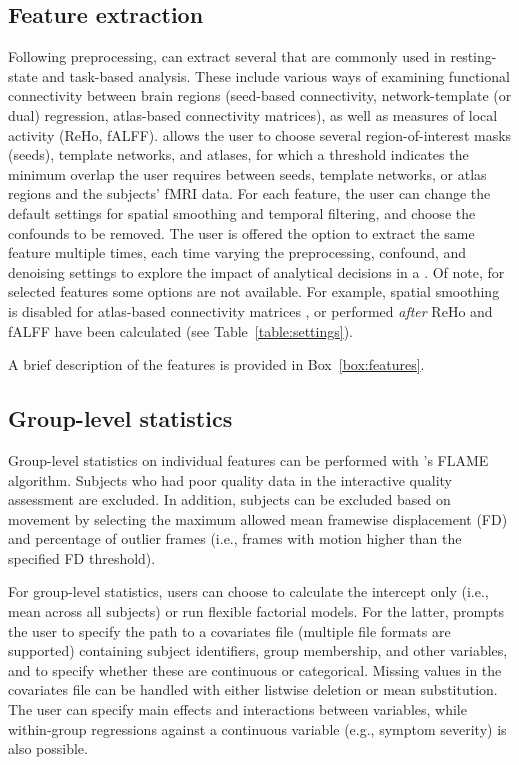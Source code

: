 \subsection{Feature extraction}\label{sec:featureextraction}

Following preprocessing,  can extract several
 that are commonly used in resting-state and task-based
analysis. These include various ways of examining functional connectivity
between brain regions (seed-based connectivity, network-template (or dual)
regression, atlas-based connectivity matrices), as well as measures of
local activity (ReHo, fALFF).  allows the user to choose
several region-of-interest masks (seeds), template networks, and atlases,
for which a threshold indicates the minimum overlap the user requires
between seeds, template networks, or atlas regions and the subjects' fMRI
data. For each feature, the user can change the default settings for
spatial smoothing and temporal filtering, and choose the confounds to be
removed. The user is offered the option to extract the same feature
multiple times, each time varying the preprocessing, confound, and
denoising settings to explore the impact of analytical decisions in a
. Of note, for selected features some options are
not available. For example, spatial smoothing is disabled for atlas-based
connectivity matrices \parencite{alakorkko2017}, or performed \emph{after}
ReHo and fALFF have been calculated (see Table~\ref{table:settings}).

A brief description of the features is provided in Box~\ref{box:features}.

\subsection{Group-level statistics}

Group-level statistics on individual features can be performed with
's FLAME algorithm. Subjects who had poor quality data in the
interactive quality assessment are excluded. In addition, subjects can be
excluded based on movement by selecting the maximum allowed mean framewise
displacement (FD) and percentage of outlier frames (i.e., frames with
motion higher than the specified FD threshold).

For group-level statistics, users can choose to calculate the intercept
only (i.e., mean across all subjects) or run flexible factorial models. For
the latter,  prompts the user to specify the path to a
covariates file (multiple file formats are supported) containing subject
identifiers, group membership, and other variables, and to specify whether
these are continuous or categorical. Missing values in the covariates file
can be handled with either listwise deletion or mean substitution. The user
can specify main effects and interactions between variables, while
within-group regressions against a continuous variable (e.g., symptom
severity) is also possible.

